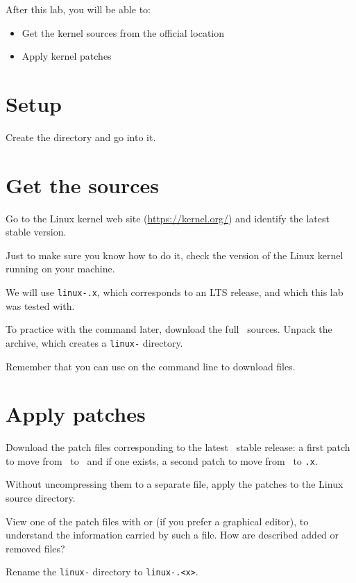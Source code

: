 
After this lab, you will be able to:
\begin{itemize}
\item Get the kernel sources from the official location
\item Apply kernel patches
\end{itemize}

\section{Setup}

Create the  directory and go into it.

\section{Get the sources}

Go to the Linux kernel web site (\url{https://kernel.org/}) and
identify the latest stable version.

Just to make sure you know how to do it, check the version of the
Linux kernel running on your machine.

We will use \texttt{linux-\workingkernel.x}, which corresponds to an LTS
release, and which this lab was tested with.

To practice with the  command later, download the full \texttt\basekernel\
sources. Unpack the archive, which creates a \texttt{linux-\basekernel}
directory.

Remember that you can use  on the command
line to download files.

\section{Apply patches}

Download the patch files corresponding to the latest \texttt\workingkernel\ stable
release: a first patch to move from \texttt\basekernel\ to
\texttt\workingkernel\ and if one exists, a second patch to move from
\texttt\workingkernel\ to \texttt{\workingkernel.x}.

Without uncompressing them to a separate file, apply the patches to the Linux
source directory.


View one of the patch files with  or 
(if you prefer a graphical editor), to understand the information carried
by such a file. How are described added or removed files?

Rename the \texttt{linux-\basekernel} directory to \texttt{linux-\workingkernel.<x>}.

